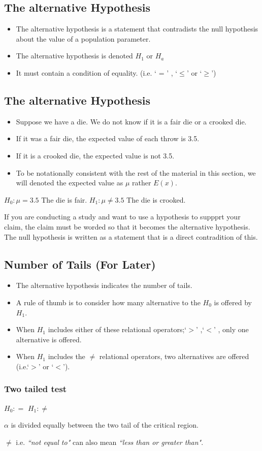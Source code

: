 \documentclass[]{article}
\begin{document}
\subsection{The alternative Hypothesis}

\begin{itemize}
	\item The alternative hypothesis is a statement that contradists the null hypothesis about the value of a population parameter.
	\item The alternative hypothesis is denoted $H_1$ or $H_a$
	\item It must contain a condition of equality. (i.e. ` = ' , `$ \leq$' or `$\geq$')
\end{itemize}

\subsection{The alternative Hypothesis}

\begin{itemize}
	\item Suppose we have a die. We do not know if it is a fair die or a crooked die.
	\item If it was a fair die, the expected value of each throw is 3.5.
	\item If it is a crooked die, the expected value is not 3.5.
	\item To be notationally consistent with the rest of the material in this section, we will denoted the expected value as $\mu$ rather $E(x)$.
\end{itemize}

$H_0 : \mu  = 3.5$  The die is fair.
$H_1 : \mu  \neq 3.5$ The die is crooked.

If you are conducting a study and want to use a hypothesis to suppprt your claim, the claim must be worded so that it becomes the alternative hypothesis.
The null hypothesis is written as a statement that is a direct contradition of this.


\subsection{Number of Tails (For Later) }

\begin{itemize}
	\item The alternative hypothesis indicates the number of tails.
	\item A rule of thumb is to consider how many alternative to the $H_0$ is offered by $H_1$.
	\item When $H_1$ includes either of these relational operators;`$>$' ,`$<$' , only one alternative is offered.
	\item When $H_1$ includes the $\neq$ relational operators, two alternatives are offered (i.e.`$>$' or `$<$').
\end{itemize}


\subsubsection{Two tailed test}

$H_0:  = $
$H_1:  \neq $

$\alpha$ is divided equally between the two tail of the critical region.

$\neq$ i.e. \emph{``not equal to"} can also mean \emph{``less than or greater than"}.
\end{document}
